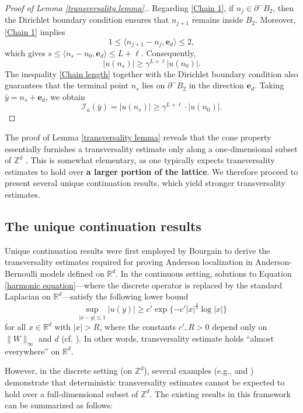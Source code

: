 \documentclass[11pt,reqno,UTF8,twoside]{amsart}
\newcommand{\Z}{\mathbb{Z}}
\newcommand{\R}{\mathbb{R}}
\theoremstyle{definition}
\numberwithin{equation}{section}
\begin{document}
\begin{proof}[Proof of Lemma \ref{transversality lemma}.]
 Regarding \eqref{Chain 1},  if  $n_j \in \partial^- B_2$, then the  Dirichlet boundary condition ensures  that  $n_{j+1}$  remains inside $B_2$. Moreover, \eqref{Chain 1} implies
    \begin{equation}\label{Chain length}
        1 \leq \langle n_{j+1} - n_j, \mathbf{e}_d \rangle \leq 2,
    \end{equation}
    which gives $s \leq \langle n_s - n_0, \mathbf{e}_d \rangle \leq L + \ell$. Consequently,
    \[
    |u(n_s)| \geq \gamma^{L+\ell} |u(n_0)|.
    \]
    The inequality \eqref{Chain length} together with the Dirichlet boundary condition also guarantees that the terminal point $n_s$ lies on  $\partial^- B_2$ in the direction $\mathbf{e}_d$. Taking $\bar{y} = n_s + \mathbf{e}_d$, we obtain
    \[
    \mathcal{I}_u(\bar{y}) = |u(n_s)| \geq \gamma^{L+\ell} \cdot |u(n_0)|.
    \]


\end{proof}

The proof of Lemma \ref{transversality lemma} reveals that the cone property essentially furnishes a transversality estimate only along a one-dimensional subset of $\Z^d$
. This is somewhat elementary, as one typically expects transversality estimates to hold over {\bf a larger portion of the lattice}. We therefore proceed to present several unique continuation results, which yield stronger transversality estimates.






\subsection{The unique continuation results}
Unique continuation results were first employed by Bourgain \cite{BK05} to derive the transversality estimates required for proving Anderson localization in Anderson-Bernoulli models defined on $\mathbb{R}^d$. In the continuous setting, solutions to Equation \eqref{harmonic equation}—where the discrete operator is replaced by the standard Laplacian on $\R^d$—satisfy the following lower bound\[\sup_{|x-y|\leq 1}|u(y)|\geq c' \exp\{-c'|x|^{\frac{4}{3}}\log|x|\}\]
for all $x \in \mathbb{R}^d$ with $|x| > R$, where the constants $c', R > 0$ depend only on $\|W\|_{\infty}$ and   $d$ (cf. \cite[Lemma 3.10]{BK05}). In other words, transversality  estimate holds ``almost everywhere''  on $\mathbb{R}^d$.

However, in the discrete setting (on $\Z^d$), several examples (e.g., \cite[Theorem 2]{Jit07} and \cite[Remark 1.3]{BLMS}) demonstrate that deterministic transversality estimates cannot be expected to hold over a full-dimensional subset of $\Z^d$. The existing results in this framework can be summarized as follows:
\end{document}
